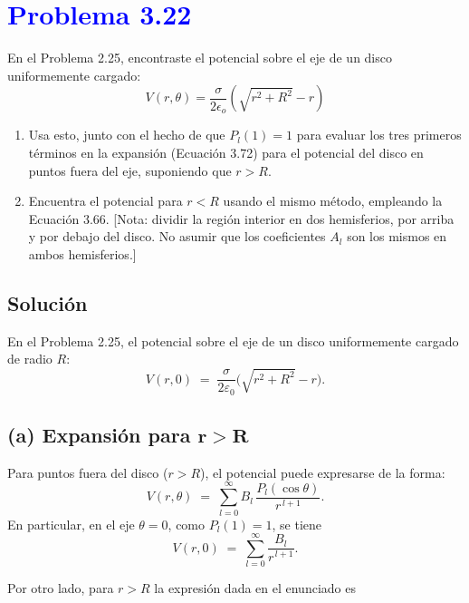 \documentclass[12pt]{article}
\newcommand{\question}[1]{\textcolor{blue}{\textbf{#1}}}
\begin{document}
\section*{\question{Problema 3.22}}
En el Problema 2.25, encontraste el potencial sobre el eje de un disco uniformemente cargado: 
\[ V(r,\theta) = \frac{\sigma}{2\epsilon_o}(\sqrt{r^2 + R^2}-r)\]
\begin{enumerate}[label=(\alph*)]
  \item   Usa esto, junto con el hecho de que \(P_l(1) = 1\) para evaluar los tres primeros términos en la expansión (Ecuación 3.72) para el potencial del disco en puntos fuera del eje, suponiendo que \(r > R\).

  \item  Encuentra el potencial para \(r < R\) usando el mismo método, empleando la Ecuación 3.66. [Nota: dividir la región interior en dos hemisferios, por arriba y por debajo del disco. No asumir que los coeficientes \(A_l\) son los mismos en ambos hemisferios.]
\end{enumerate}

\subsection*{Solución}
En el Problema 2.25, el potencial sobre el eje de un disco uniformemente cargado de radio \(R\):
\[
V(r,0) \;=\; \frac{\sigma}{2\varepsilon_{0}}\bigl(\sqrt{r^{2} + R^{2}} - r \bigr).
\]


\subsection*{(a) Expansión para \(\boldsymbol{r>R}\)}

Para puntos fuera del disco (\(r>R\)),  el potencial puede expresarse de la forma:
\[
V(r,\theta)
\;=\;
\sum_{l=0}^{\infty} B_{l}\,\frac{P_{l}(\cos\theta)}{r^{\,l+1}}.
\]
En particular, en el eje \(\theta=0\), como \(P_{l}(1)=1\), se tiene
\[
V(r,0)
\;=\;
\sum_{l=0}^{\infty} \frac{B_{l}}{r^{\,l+1}}.
\]

Por otro lado, para \(r>R\) la expresión dada en el enunciado es
\end{document}

